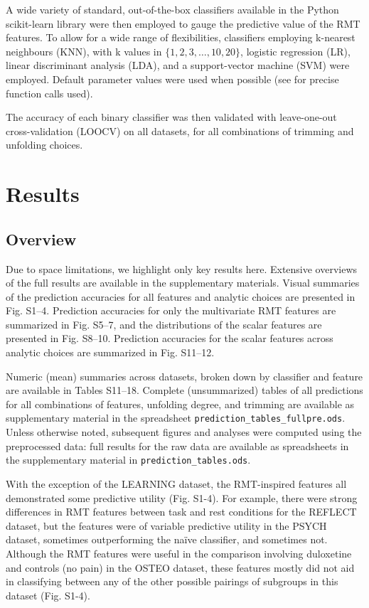 \documentclass[NETN,manuscript]{stjour-new}
\begin{document}
A wide variety of standard, out-of-the-box classifiers available in the Python scikit-learn library
\citep{pedregosaScikitlearnMachineLearning2011} were then employed to gauge the predictive value of
the RMT features. To allow for a wide range of flexibilities, classifiers employing k-nearest
neighbours (KNN), with k values in \(\{1, 2, 3, \dots, 10, 20\}\), logistic regression (LR), linear
discriminant analysis (LDA), and a support-vector machine (SVM) were employed. Default parameter
values were used when possible (see \cite{bergerderekm.DMBergerRandommatrixfmriV02020} for precise
function calls used).

The accuracy of each binary classifier was then validated with leave-one-out cross-validation
(LOOCV) on all datasets, for all combinations of trimming and unfolding choices.

\section{Results}

\subsection{Overview}
Due to space limitations, we highlight only key results here. Extensive overviews of the full
results are available in the supplementary materials. Visual summaries of the prediction accuracies
for all features and analytic choices are presented in Fig. S1--4. Prediction accuracies for only the
multivariate RMT features are summarized in Fig. S5--7, and the distributions of the scalar features
are presented in Fig. S8--10. Prediction accuracies for the scalar features across analytic choices
are summarized in Fig. S11--12.

Numeric (mean) summaries across datasets, broken down by classifier and feature are available in
Tables S11--18. Complete (unsummarized) tables of all predictions for all combinations of features,
unfolding degree, and trimming are available as supplementary material in the spreadsheet
\texttt{prediction\_tables\_fullpre.ods}. Unless otherwise noted, subsequent figures and analyses were
computed using the preprocessed data: full results for the raw data are available as spreadsheets in
the supplementary material in \texttt{prediction\_tables.ods}.

With the exception of the LEARNING dataset, the RMT-inspired features all demonstrated some
predictive utility (Fig. S1-4). For example, there were strong differences in RMT features between
task and rest conditions for the REFLECT dataset, but the features were of variable predictive
utility in the PSYCH dataset, sometimes outperforming the naïve classifier, and sometimes not.
Although the RMT features were useful in the comparison involving duloxetine and controls (no pain)
in the OSTEO dataset, these features mostly did not aid in classifying between any of the other
possible pairings of subgroups in this dataset (Fig. S1-4).
\end{document}

